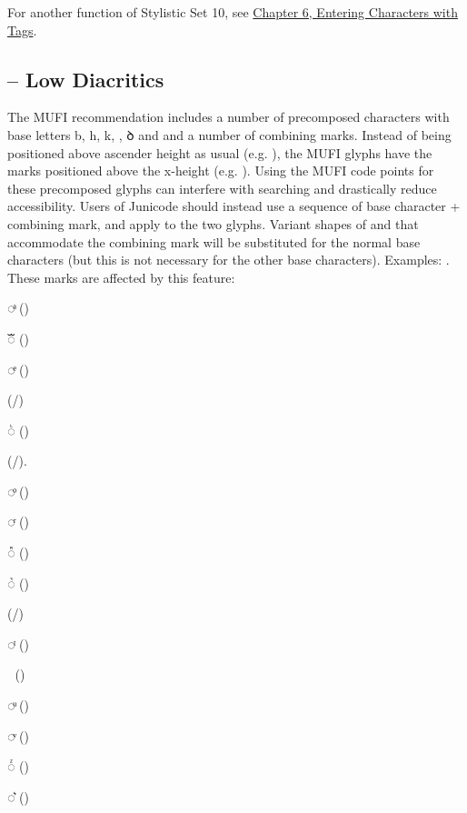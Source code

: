 \noindent For another function of Stylistic Set 10, see
\hyperlink{tagchapter}{Chapter 6, Entering Characters with Tags}.

\subsection{ – Low Diacritics}
The MUFI recommendation includes a number of precomposed characters with base letters
{b, h, k, {\th}, ꝺ and {\dh}} and a number of combining
marks. Instead of being positioned above ascender height as usual (e.g.
), the MUFI glyphs have the marks positioned above the x-height
(e.g. ).
Using the MUFI code points for these precomposed glyphs can interfere with searching
and drastically reduce accessibility. Users of Junicode should instead use a sequence of base character + combining
mark, and apply  to the two glyphs. Variant shapes of  and \textex{{\dh}}
that accommodate the combining mark will be substituted for the normal base characters (but this is not necessary for
the other base characters). Examples:
. These marks are affected by this
feature:

\begin{multicols}{3}
  \jSmCond\color{BrickRed}◌ͣ ()

  ◌ᷓ ()

  ◌ͤ ()

   (\slash{})

  ◌ᷞ ()

   (\slash{}).

  ◌ͦ ()

  ◌ͬ ()

  ◌ᷢ ()

  ◌ᷣ ()

   (\slash{})

  ◌ͭ ()

  ◌ᫎ ()

  ◌ͧ ()

  ◌ͮ ()

  ◌ᷦ ()

  ◌͛ ()
  \end{multicols}
  
